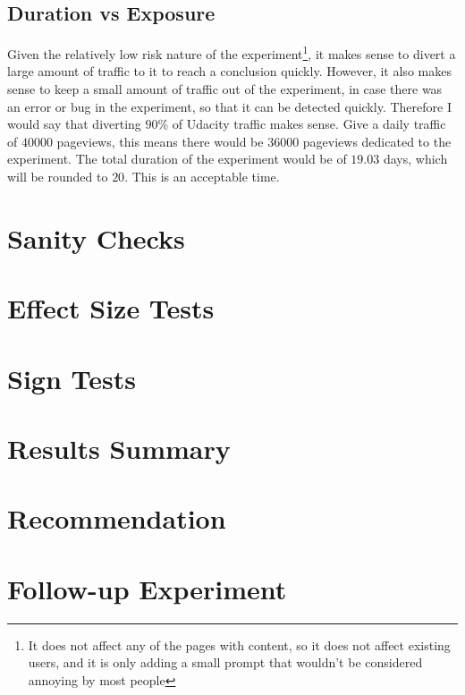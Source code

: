 \documentclass[12pt,a4paper]{article}
\begin{document}
\subsection{Duration vs Exposure}
Given the relatively low risk nature of the experiment\footnote{It does not
affect any of the pages with content, so it does not affect existing users, and
it is only adding a small prompt that wouldn't be considered annoying by most
people}, it makes sense to divert a large amount of traffic to it to reach a
conclusion quickly. However, it also makes sense to keep a small amount of
traffic out of the experiment, in case there was an error or bug in the
experiment, so that it can be detected quickly.  Therefore I would say that
diverting $90$\% of Udacity traffic makes sense. Give a daily traffic of $40000$
pageviews, this means there would be $36000$ pageviews dedicated to the
experiment. The total duration of the experiment would be of $19.03$ days, which
will be rounded to $20$. This is an acceptable time.

\section{Sanity Checks}

\section{Effect Size Tests}

\section{Sign Tests}

\section{Results Summary}

\section{Recommendation}

\section{Follow-up Experiment}
\end{document}
